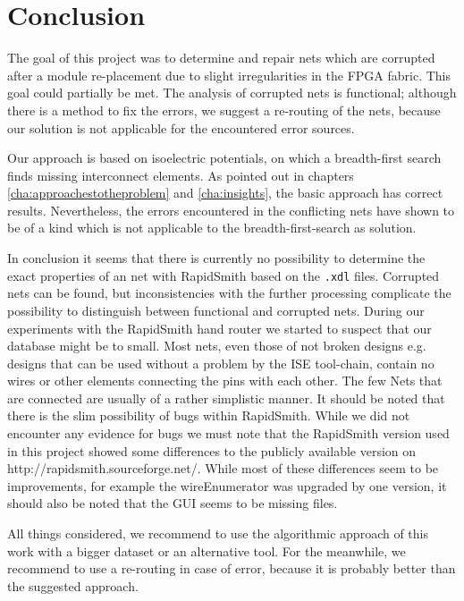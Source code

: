 \chapter{Conclusion}
\label{cha:conclusion}

The goal of this project was to determine and repair nets which are corrupted after a module re-placement due to slight irregularities in the FPGA fabric. This goal could partially be met. The analysis of corrupted nets is functional; although there is a method to fix the errors, we suggest a re-routing of the nets, because our solution is not applicable for the encountered error sources.

Our approach is based on isoelectric potentials, on which a breadth-first search finds missing interconnect elements. As pointed out in chapters \ref{cha:approachestotheproblem} and \ref{cha:insights}, the basic approach has correct results. Nevertheless, the errors encountered in the conflicting nets have shown to be of a kind which is not applicable to the breadth-first-search as solution. 

In conclusion it seems that there is currently no possibility to determine the exact properties of an net with RapidSmith based on the \texttt{.xdl} files. Corrupted nets can be found, but inconsistencies with the further processing complicate the possibility to distinguish between functional and corrupted nets.
During our experiments with the RapidSmith hand router we started to suspect that our database might be to small. Most nets, even those of not broken designs e.g. designs that can be used without a problem by the ISE tool-chain, contain no wires or other elements connecting the pins with each other. The few Nets that are connected are usually of a rather simplistic manner.
It should be noted that there is the slim possibility of bugs within RapidSmith. While we did not encounter any evidence for bugs we must note that the RapidSmith version used in this project showed some differences to the publicly available version on http://rapidsmith.sourceforge.net/. While most of these differences seem to be improvements, for example the wireEnumerator was upgraded by one version, it should also be noted that the GUI seems to be missing files.

All things considered, we recommend to use the algorithmic approach of this work with a bigger dataset or an alternative tool. For the meanwhile, we recommend to use a re-routing in case of error, because it is probably better than the suggested approach.

